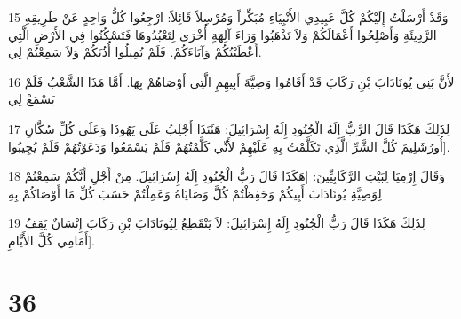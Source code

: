 \par 15 وَقَدْ أَرْسَلْتُ إِلَيْكُمْ كُلَّ عَبِيدِي الأَنْبِيَاءِ مُبَكِّراً وَمُرْسِلاً قَائِلاً: ارْجِعُوا كُلُّ وَاحِدٍ عَنْ طَرِيقِهِ الرَّدِيئَةِ وَأَصْلِحُوا أَعْمَالَكُمْ وَلاَ تَذْهَبُوا وَرَاءَ آلِهَةٍ أُخْرَى لِتَعْبُدُوهَا فَتَسْكُنُوا فِي الأَرْضِ الَّتِي أَعْطَيْتُكُمْ وَآبَاءَكُمْ. فَلَمْ تُمِيلُوا أُذُنَكُمْ وَلاَ سَمِعْتُمْ لِي.
\par 16 لأَنَّ بَنِي يُونَادَابَ بْنِ رَكَابَ قَدْ أَقَامُوا وَصِيَّةَ أَبِيهِمِ الَّتِي أَوْصَاهُمْ بِهَا. أَمَّا هَذَا الشَّعْبُ فَلَمْ يَسْمَعْ لِي
\par 17 لِذَلِكَ هَكَذَا قَالَ الرَّبُّ إِلَهُ الْجُنُودِ إِلَهُ إِسْرَائِيلَ: هَئَنَذَا أَجْلِبُ عَلَى يَهُوذَا وَعَلَى كُلِّ سُكَّانِ أُورُشَلِيمَ كُلَّ الشَّرِّ الَّذِي تَكَلَّمْتُ بِهِ عَلَيْهِمْ لأَنِّي كَلَّمْتُهُمْ فَلَمْ يَسْمَعُوا وَدَعَوْتُهُمْ فَلَمْ يُجِيبُوا].
\par 18 وَقَالَ إِرْمِيَا لِبَيْتِ الرَّكَابِيِّينَ: [هَكَذَا قَالَ رَبُّ الْجُنُودِ إِلَهُ إِسْرَائِيلَ. مِنْ أَجْلِ أَنَّكُمْ سَمِعْتُمْ لِوَصِيَّةِ يُونَادَابَ أَبِيكُمْ وَحَفِظْتُمْ كُلَّ وَصَايَاهُ وَعَمِلْتُمْ حَسَبَ كُلِّ مَا أَوْصَاكُمْ بِهِ
\par 19 لِذَلِكَ هَكَذَا قَالَ رَبُّ الْجُنُودِ إِلَهُ إِسْرَائِيلَ: لاَ يَنْقَطِعُ لِيُونَادَابَ بْنِ رَكَابَ إِنْسَانٌ يَقِفُ أَمَامِي كُلَّ الأَيَّامِ].

\chapter{36}

